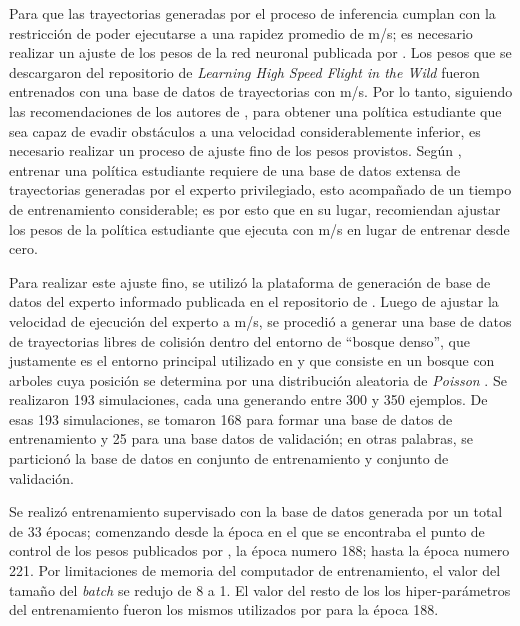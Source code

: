 Para que las trayectorias generadas por el proceso de inferencia cumplan con la restricción de poder ejecutarse a una rapidez promedio de  m/s; es necesario realizar un ajuste de los pesos de la red neuronal publicada por \cite{Loquercio2021}. Los pesos que se descargaron del repositorio de \textit{Learning High Speed Flight in the Wild} fueron entrenados con una base de datos de trayectorias con  m/s. Por lo tanto, siguiendo las recomendaciones de los autores de \cite{Loquercio2021}, para obtener una política estudiante que sea capaz de evadir obstáculos a una velocidad considerablemente inferior, es necesario realizar un proceso de ajuste fino de los pesos provistos. Según \cite{Loquercio2021}, entrenar una política estudiante requiere de una base de datos extensa de trayectorias generadas por el experto privilegiado, esto acompañado de un tiempo de entrenamiento considerable; es por esto que en su lugar, recomiendan ajustar los pesos de la política estudiante que ejecuta con  m/s en lugar de entrenar desde cero.

Para realizar este ajuste fino, se utilizó la plataforma de generación de base de datos del experto informado publicada en el repositorio de \cite{Loquercio2021}. Luego de ajustar la velocidad de ejecución del experto a  m/s, se procedió a generar una base de datos de trayectorias libres de colisión dentro del entorno de ``bosque denso'', que justamente es el entorno principal utilizado en \cite{Loquercio2021} y que consiste en un bosque con arboles cuya posición se determina por una distribución aleatoria de \textit{Poisson} \cite{Loquercio2021}. Se realizaron 193 simulaciones, cada una generando entre 300 y 350 ejemplos. De esas 193 simulaciones, se tomaron 168 para formar una base de datos de entrenamiento y 25 para una base datos de validación; en otras palabras, se particionó la base de datos en  conjunto de entrenamiento y  conjunto de validación.

Se realizó entrenamiento supervisado con la base de datos generada por un total de 33 épocas; comenzando desde la época en el que se encontraba el punto de control de los pesos publicados por \cite{Loquercio2021}, la época numero 188; hasta la época numero 221. Por limitaciones de memoria del computador de entrenamiento, el valor del tamaño del \textit{batch} se redujo de 8 a 1. El valor del resto de los los hiper-parámetros del entrenamiento fueron los mismos utilizados por \cite{Loquercio2021} para la época 188.

